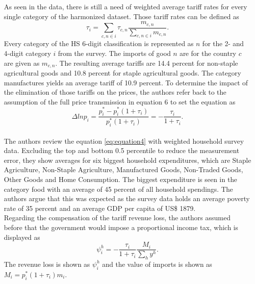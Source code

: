 As seen in the data, there is still a need of weighted average tariff rates for every single category of the harmonized 
dataset. Those tariff rates can be defined as 
\begin{equation} \label{eq:equation9}
    \tau_{i}= \sum_{c,n \in i} \tau_{c,n} \frac{m_{c,n}}{\sum_{c,n \in i}m_{c,n}}.
\end{equation}
Every category of the HS 6-digit classification is represented as \(n\) for the 2- and 4-digit category \(i\) from the survey. 
The imports of good \(n\) are for the country \(c\) are given as \(m_{c,n}\). The resulting average tariffs are 14.4 percent
for non-staple agricultural goods and 10.8 percent for staple agricultural goods. The category manufactures yields an
average tariff of 10.9 percent.
To determine the impact of the elimination of those tariffs on the prices, the authors refer back to the assumption of the 
full price transmission in equation 6
to set the equation as
\begin{equation} \label{eq:equation10}
    \Delta ln p_{i} = \frac{p_{i}^*-p_{i}^*(1+\tau_{i})}{p_{i}^*(1+\tau_{i})} = -\frac{\tau_{i}}{1+\tau_{i}}.
\end{equation}\\

The authors review the equation \ref{eq:equation4} with weighted household survey data. Excluding the top and bottom 
0.5 percentile to reduce the measurement error, they show averages for six biggest household expenditures, which are
Staple Agriculture, Non-Staple Agriculture, Manufactured Goods, Non-Traded Goods, Other Goods and Home Consumption. The biggest
expenditure is seen in the category food with an average of 45 percent of all household spendings. The authors argue that this
was expected as the survey data holds an average poverty rate of 35 percent and an average GDP per capita of US\$ 1879.\\

Regarding the compensation of the tariff revenue loss, the authors assumed before that the government would impose a proportional
income tax, which is displayed as 
\begin{equation} \label{eq:equation11}
    \psi_{i}^h = -\frac{\tau_ {i}}{1+\tau_{i}} \frac{M_{i}}{\sum_{h}y^h}.    
\end{equation}
The revenue loss is shown as \(\psi_{i}^h\) and the value of imports is shown as \(M_{i} = p_{i}^*(1+\tau_{i})m_{i}\).


